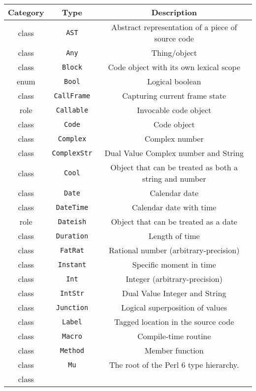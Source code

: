 \documentclass[17pt,english]{extarticle}
\providecommand{\tabularnewline}{\\}
\begin{document}
\begin{longtable}{|c|c|c|}
\hline 
\textbf{\small{}Category} &
\textbf{\small{}Type} &
\textbf{\small{}Description}\tabularnewline
\hline 
\hline 
{\small{}class} &
\texttt{\small{}AST} &
{\small{}Abstract representation of a piece of source code}\tabularnewline
\hline 
{\small{}class} &
\texttt{\small{}Any} &
{\small{}Thing/object}\tabularnewline
\hline 
{\small{}class} &
\texttt{\small{}Block} &
{\small{}Code object with its own lexical scope}\tabularnewline
\hline 
{\small{}enum} &
\texttt{\small{}Bool} &
{\small{}Logical boolean}\tabularnewline
\hline 
{\small{}class} &
\texttt{\small{}CallFrame} &
{\small{}Capturing current frame state}\tabularnewline
\hline 
{\small{}role} &
\texttt{\small{}Callable} &
{\small{}Invocable code object}\tabularnewline
\hline 
{\small{}class} &
\texttt{\small{}Code} &
{\small{}Code object}\tabularnewline
\hline 
{\small{}class} &
\texttt{\small{}Complex} &
{\small{}Complex number}\tabularnewline
\hline 
{\small{}class} &
\texttt{\small{}ComplexStr} &
{\small{}Dual Value Complex number and String}\tabularnewline
\hline 
{\small{}class} &
\texttt{\small{}Cool} &
{\small{}Object that can be treated as both a string and number}\tabularnewline
\hline 
{\small{}class} &
\texttt{\small{}Date} &
{\small{}Calendar date}\tabularnewline
\hline 
{\small{}class} &
\texttt{\small{}DateTime} &
{\small{}Calendar date with time}\tabularnewline
\hline 
{\small{}role} &
\texttt{\small{}Dateish} &
{\small{}Object that can be treated as a date}\tabularnewline
\hline 
{\small{}class} &
\texttt{\small{}Duration} &
{\small{}Length of time}\tabularnewline
\hline 
{\small{}class} &
\texttt{\small{}FatRat} &
{\small{}Rational number (arbitrary-precision)}\tabularnewline
\hline 
{\small{}class} &
\texttt{\small{}Instant} &
{\small{}Specific moment in time}\tabularnewline
\hline 
{\small{}class} &
\texttt{\small{}Int} &
{\small{}Integer (arbitrary-precision)}\tabularnewline
\hline 
{\small{}class} &
\texttt{\small{}IntStr} &
{\small{}Dual Value Integer and String}\tabularnewline
\hline 
{\small{}class} &
\texttt{\small{}Junction} &
{\small{}Logical superposition of values}\tabularnewline
\hline 
{\small{}class} &
\texttt{\small{}Label} &
{\small{}Tagged location in the source code}\tabularnewline
\hline 
{\small{}class} &
\texttt{\small{}Macro} &
{\small{}Compile-time routine}\tabularnewline
\hline 
{\small{}class} &
\texttt{\small{}Method} &
{\small{}Member function}\tabularnewline
\hline 
{\small{}class} &
\texttt{\small{}Mu} &
{\small{}The root of the Perl 6 type hierarchy.}\tabularnewline
\hline 
{\small{}class} &

\end{longtable}
\end{document}
